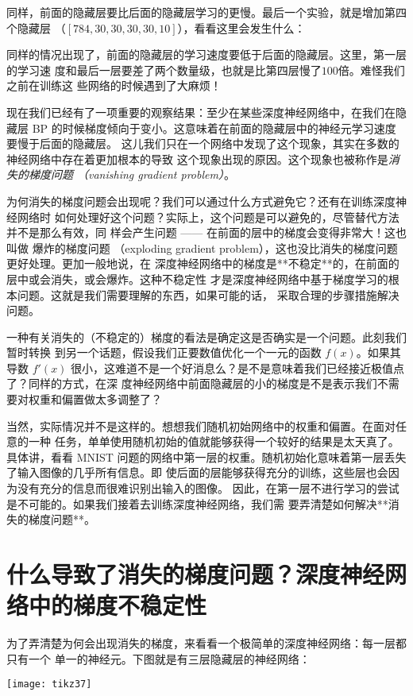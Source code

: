 同样，前面的隐藏层要比后面的隐藏层学习的更慢。最后一个实验，就是增加第四个隐藏层
（$[784, 30, 30, 30, 30, 10]$），看看这里会发生什么：
 
同样的情况出现了，前面的隐藏层的学习速度要低于后面的隐藏层。这里，第一层的学习速
度和最后一层要差了两个数量级，也就是比第四层慢了$100$倍。难怪我们之前在训练这
些网络的时候遇到了大麻烦！
 
现在我们已经有了一项重要的观察结果：至少在某些深度神经网络中，在我们在隐藏层 BP
的时候梯度倾向于变小。这意味着在前面的隐藏层中的神经元学习速度要慢于后面的隐藏层。
这儿我们只在一个网络中发现了这个现象，其实在多数的神经网络中存在着更加根本的导致
这个现象出现的原因。这个现象也被称作是\emph{消失的梯度问题
  （vanishing gradient problem）}。
 
为何消失的梯度问题会出现呢？我们可以通过什么方式避免它？还有在训练深度神经网络时
如何处理好这个问题？实际上，这个问题是可以避免的，尽管替代方法并不是那么有效，同
样会产生问题 —— 在前面的层中的梯度会变得非常大！这也叫做 爆炸的梯度问题
（exploding gradient problem），这也没比消失的梯度问题更好处理。更加一般地说，在
深度神经网络中的梯度是**不稳定**的，在前面的层中或会消失，或会爆炸。这种不稳定性
才是深度神经网络中基于梯度学习的根本问题。这就是我们需要理解的东西，如果可能的话，
采取合理的步骤措施解决问题。
 
一种有关消失的（不稳定的）梯度的看法是确定这是否确实是一个问题。此刻我们暂时转换
到另一个话题，假设我们正要数值优化一个一元的函数 $f(x)$。如果其导数 $f'(x)$
很小，这难道不是一个好消息么？是不是意味着我们已经接近极值点了？同样的方式，在深
度神经网络中前面隐藏层的小的梯度是不是表示我们不需要对权重和偏置做太多调整了？
 
当然，实际情况并不是这样的。想想我们随机初始网络中的权重和偏置。在面对任意的一种
任务，单单使用随机初始的值就能够获得一个较好的结果是太天真了。具体讲，看看 MNIST
问题的网络中第一层的权重。随机初始化意味着第一层丢失了输入图像的几乎所有信息。即
使后面的层能够获得充分的训练，这些层也会因为没有充分的信息而很难识别出输入的图像。
因此，在第一层不进行学习的尝试是不可能的。如果我们接着去训练深度神经网络，我们需
要弄清楚如何解决**消失的梯度问题**。

\section{什么导致了消失的梯度问题？深度神经网络中的梯度不稳定性}

为了弄清楚为何会出现消失的梯度，来看看一个极简单的深度神经网络：每一层都只有一个
单一的神经元。下图就是有三层隐藏层的神经网络：
\begin{center}
  \texttt{[image: tikz37]}
\end{center}

